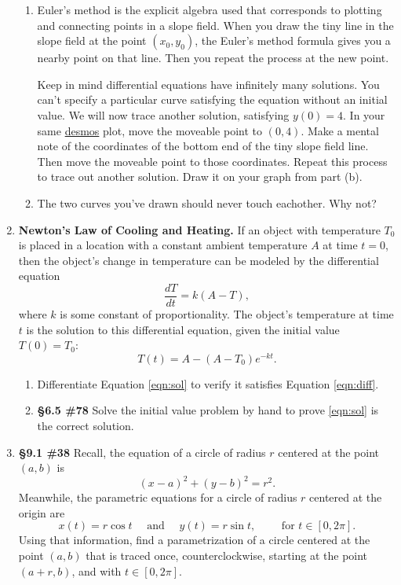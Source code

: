 \documentclass[%
]{article}
\begin{document}
\begin{enumerate}
\begin{enumerate}
	\item Euler's method is the explicit algebra used that corresponds to plotting and connecting points in a slope field.  When you draw the tiny line in the slope field at the point $(x_0,y_0)$, the Euler's method formula gives you a nearby point on that line.  Then you repeat the process at the new point.

	\vspace{0.5pc}
	Keep in mind differential equations have infinitely many solutions.  You can't specify a particular curve satisfying the equation without an initial value.  We will now trace another solution, satisfying $y(0)=4$.  In your same \url{desmos} plot, move the moveable point to $(0,4)$.  Make a mental note of the coordinates of the bottom end of the tiny slope field line.  Then move the moveable point to those coordinates.  Repeat this process to trace out another solution.  Draw it on your graph from part (b).
	\item The two curves you've drawn should never touch eachother.  Why not?  
	\end{enumerate}
	
\newpage	
\item \textbf{Newton's Law of Cooling and Heating.}  If an object with temperature $T_0$ is placed in a location with a constant ambient temperature $A$ at time $t=0$, then the object's change in temperature can be modeled by the differential equation
\begin{equation}
\label{eqn:diff}
\frac{dT}{dt}=k(A-T),
\end{equation}
where $k$ is some constant of proportionality.  The object's temperature at time $t$ is the solution to this differential equation, given the initial value $T(0)=T_0$:
\begin{equation}
\label{eqn:sol}
T(t)=A-(A-T_0)e^{-kt}.
\end{equation}
	\begin{enumerate}
	\item Differentiate Equation \eqref{eqn:sol} to verify it satisfies Equation \eqref{eqn:diff}.
	\item {\bf \S6.5 \#78} Solve the initial value problem by hand to prove \eqref{eqn:sol} is the correct solution. 
	\end{enumerate}

\item {\bf \S9.1 \#38}  Recall, the equation of a circle of radius $r$ centered at the point $(a,b)$ is
\[
(x-a)^2+(y-b)^2=r^2.
\]
Meanwhile, the parametric equations for a circle of radius $r$ centered at the origin are
\[
x(t)=r\cos t\quad\text{ and }\quad y(t)=r\sin t,\qquad\text{ for } t\in[0,2\pi].
\]
Using that information, find a parametrization of a circle centered at the point $(a,b)$ that is traced once, counterclockwise, starting at the point $(a+r,b)$, and with $t\in[0,2\pi]$.


\end{enumerate}
\end{document}
